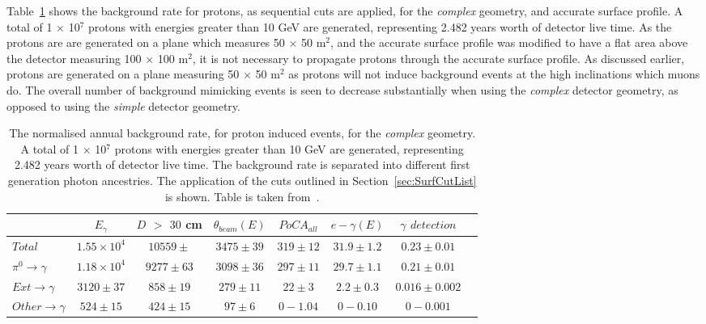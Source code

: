 Table~\ref{tab:SurfProComp} shows the background rate for protons, as sequential cuts are applied, for the \emph{complex} geometry, and accurate surface profile. A total of 1 $\times$ 10$^7$ protons with energies greater than 10 GeV are generated, representing 2.482 years worth of detector live time. As the protons are are generated on a plane which measures 50 $\times$ 50 m$^{2}$, and the accurate surface profile was modified to have a flat area above the detector measuring 100 $\times$ 100 m$^{2}$, it is not necessary to propagate protons through the accurate surface profile. As discussed earlier, protons are generated on a plane measuring 50 $\times$ 50 m$^{2}$ as protons will not induce background events at the high inclinations which muons do. The overall number of background mimicking events is seen to decrease substantially when using the \emph{complex} detector geometry, as opposed to using the \emph{simple} detector geometry. \\

\begin{table}
  \caption[The normalised annual background rate, for proton induced events, for the \emph{complex} geometry]
          {The normalised annual background rate, for proton induced events, for the \emph{complex} geometry. A total of 1 $\times$ 10$^7$ protons with energies greater than 10 GeV are generated, representing 2.482 years worth of detector live time. The background rate is separated into different first generation photon ancestries. The application of the cuts outlined in Section~\ref{sec:SurfCutList} is shown. Table is taken from~\citep{MartinsThesis}.}
  \label{tab:SurfProComp}
  \centering
  \scriptsize
  \begin{tabular}{l c c c c c c c }
    \toprule
        & $E_\gamma$ &  $D$ $>$ $30$ cm & $\theta_{beam}(E)$ & $PoCA_{all}$ & $e-\gamma(E)$ & $\gamma$ $detection$ \\
        \midrule
        $Total$          & $1.55\times10^4$ & $10559\pm$  & $3475\pm39$ & $319\pm12$ & $31.9\pm1.2$ & $0.23\pm0.01$ \\

        $\pi^0\to\gamma$ & $1.18\times10^4$ & $9277\pm63$  & $3098\pm36$ & $297\pm11$ & $29.7\pm1.1$ & $0.21\pm0.01$ \\

        $Ext\to\gamma$   & $3120\pm37$      & $858\pm19$   & $279\pm11$  & $22\pm3$   & $2.2\pm0.3$  & $0.016\pm0.002$ \\

        $Other\to\gamma$ & $524\pm15$       & $424\pm15$   & $97\pm6$    & $0-1.04$   & $0-0.10$     & $0-0.001$ \\
        \bottomrule
  \end{tabular}
\end{table}

